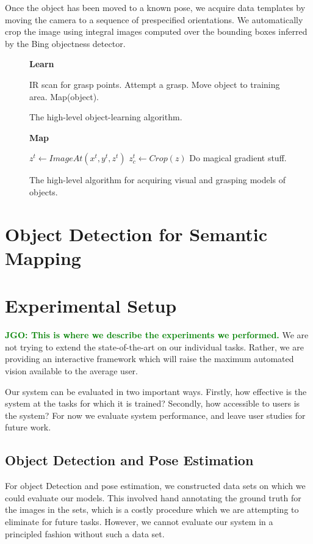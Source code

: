 \documentclass[conference]{IEEEtran}
\newcommand{\jgonote}[1]{\textcolor{green}{\textbf{JGO: #1}}}
\begin{document}
Once the object has been moved to a known pose, we acquire data
templates by moving the camera to a sequence of prespecified
orientations.  We automatically crop the image using integral images
computed over the bounding boxes inferred by the Bing objectness
detector. 


\begin{figure}
  \textbf{Learn}
  \begin{algorithmic}
      \STATE IR scan for grasp points.
      \STATE Attempt a grasp.
        \STATE Move object to training area.
        \STATE Map(object).
      \ENDIF
    \ENDWHILE
  \end{algorithmic}
  \caption{The high-level object-learning algorithm.\label{alg:learning}}
\end{figure}


\begin{figure}
  \textbf{Map}
  \begin{algorithmic}
    \STATE $z^t \gets ImageAt (x^t, y^t, z^t)$
    \STATE $z_c^t \gets Crop(z)$
    \STATE Do magical gradient stuff. 
    \ENDFOR
  \end{algorithmic}
  \caption{The high-level algorithm for acquiring visual and grasping
    models of objects.}
\end{figure}


\section{Object Detection for Semantic Mapping}
\label{sec:mapping}
 
\section{Experimental Setup}
\jgonote{This is where we describe the experiments we performed.}
We are not trying to extend the state-of-the-art on our individual tasks. Rather,
we are providing an interactive framework which will raise the maximum automated vision
available to the average user.

Our system can be evaluated in two important ways. Firstly, how effective is 
the system at the tasks for which it is trained? Secondly, how accessible to users is the system?
For now we evaluate system performance, and leave user studies for future work.

\subsection{Object Detection and Pose Estimation}
For object Detection and pose estimation, we constructed data
sets on which we could evaluate our models. This involved hand
annotating the ground truth for the images in the sets, which is a
costly procedure which we are attempting to eliminate for future tasks.
However, we cannot evaluate our system in a principled fashion without such
a data set.
\end{document}
